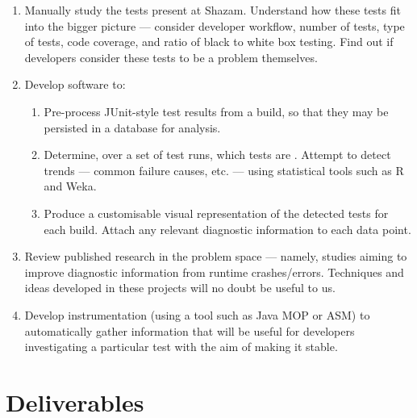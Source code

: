 \begin{enumerate}
	\item{
		Manually study the \flaky tests present at Shazam. Understand how these
		tests fit into the bigger picture --- consider developer workflow, number of
		tests, type of tests, code coverage, and ratio of black to white box
		testing. Find out if developers consider these tests to be a problem
		themselves.
	}
	\item{
		Develop software to:
		\begin{enumerate}
			\item{
				Pre-process JUnit-style test results from a build, so that they may be
				persisted in a database for analysis.
			}
			\item{
				Determine, over a set of test runs, which tests are \flaky. Attempt to
				detect trends --- common failure causes, etc. --- using statistical
				tools such as R and Weka.
			}
			\item{
				Produce a customisable visual representation of the detected \flaky
				tests for each build. Attach any relevant diagnostic information to each
				data point.
			}
		\end{enumerate}
	}
	\item{
		Review published research in the problem space --- namely, studies aiming to
		improve diagnostic information from runtime crashes/errors. Techniques and
		ideas developed in these projects will no doubt be useful to us.
	}
	\item{
		Develop instrumentation (using a tool such as Java MOP or ASM) to
		automatically gather information that will be useful for developers
		investigating a particular test with the aim of making it stable.
	}
\end{enumerate}

\section{Deliverables}

